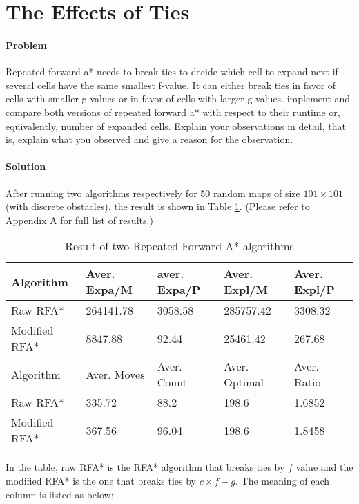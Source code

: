\section{The Effects of Ties}

\paragraph{Problem} 
Repeated forward a* needs to break ties to decide which cell to expand next if
several cells have the same smallest f-value. It can either break ties in favor
of cells with smaller g-values or in favor of cells with larger g-values.
implement and compare both versions of repeated forward a* with respect to
their runtime or, equivalently, number of expanded cells. Explain your
observations in detail, that is, explain what you observed and give a reason
for the observation.

\paragraph{Solution} 
After running two algorithms respectively for 50 random maps of size $101\times
101$ (with discrete obstacles), the result is shown in Table \ref{tbl:two-rpa}.
(Please refer to Appendix A for full list of results.)

\begin{table}[h!]
\centering
\caption{Result of two Repeated Forward A* algorithms}
\begin{tabular}{|l|l|l|l|l|}
\hline
Algorithm & Aver. Expa/M & aver. Expa/P & Aver. Expl/M & Aver. Expl/P \\
\hline
Raw RFA* & 264141.78 & 3058.58 & 285757.42 & 3308.32 \\
\hline
Modified RFA* & 8847.88 & 92.44 & 25461.42 & 267.68 \\
\hhline{|=|=|=|=|=|}
Algorithm & Aver. Moves & Aver. Count & Aver. Optimal & Aver. Ratio \\
\hline
Raw RFA* & 335.72 & 88.2 & 198.6 & 1.6852 \\
\hline
Modified RFA* & 367.56 & 96.04 & 198.6 & 1.8458 \\
\hline
\end{tabular}
\label{tbl:two-rpa}
\end{table}

In the table, raw RFA* is the RFA* algorithm that breaks ties by $f$ value and
the modified RFA* is the one that breaks ties by $c\times f-g$. The meaning of
each column is listed as below:

